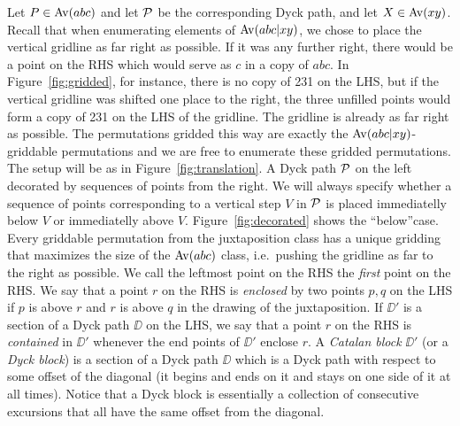 Let $P \in \Av(abc)$ and let $\P$ be the corresponding Dyck path, and let $X \in \Av(xy)$. Recall that when enumerating elements of $\Av(abc|xy)$, we chose to place the vertical gridline as far right as possible.  If it was any further right, there would be a point on the RHS which would serve as $c$ in a copy of $abc$. In Figure~\ref{fig:gridded}, for instance, there is no copy of 231 on the LHS, but if the vertical gridline was shifted one place to the right, the three unfilled points would form a copy of 231 on the LHS of the gridline. The gridline is already as far right as possible. The permutations gridded this way are exactly the $\Av(abc|xy)$-griddable permutations and we are free to enumerate these gridded permutations. The setup will be as in Figure~\ref{fig:translation}. A Dyck path $\P$ on the left decorated by sequences of points from the right. We will always specify whether a sequence of points corresponding to a vertical step $V$ in $\P$ is placed immediatelly below $V$ or immediatelly above $V$. Figure~\ref{fig:decorated} shows the ``below''case. Every griddable permutation from the juxtaposition class has a unique gridding that maximizes the size of the $\Av(abc)$ class, i.e.~pushing the gridline as far to the right as possible. We call the leftmost point on the RHS the \emph{first} point on the RHS. We say that a point $r$ on the RHS is \emph{enclosed} by two points $p,q$ on the LHS if $p$ is above $r$ and $r$ is above $q$ in the drawing of the juxtaposition. If $\DD'$ is a section of a Dyck path $\DD$ on the LHS, we say that a point $r$ on the RHS is \emph{contained} in $\DD'$ whenever the end points of $\DD'$ enclose $r$. A \emph{Catalan block} $\DD'$ (or a \emph{Dyck block}) is a section of a Dyck path $\DD$ which is a Dyck path with respect to some offset of the diagonal (it begins and ends on it and stays on one side of it at all times). Notice that a Dyck block is essentially a collection of consecutive excursions that all have the same offset from the diagonal.

